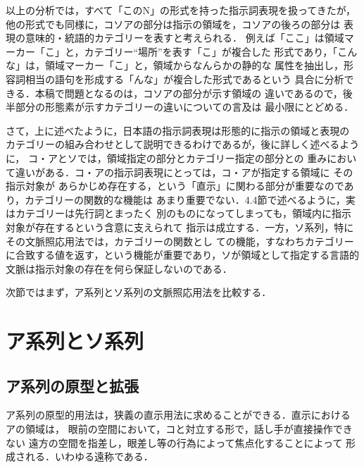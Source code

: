 以上の分析では，すべて「このN」の形式を持った指示詞表現を扱ってきたが，
他の形式でも同様に，コソアの部分は指示の領域を，コソアの後ろの部分は
表現の意味的・統語的カテゴリーを表すと考えられる．
例えば「ここ」は領域マーカー「こ」と，カテゴリー``場所''を表す「こ」が複合した
形式であり，「こんな」は，領域マーカー「こ」と，領域からなんらかの静的な
属性を抽出し，形容詞相当の語句を形成する「んな」が複合した形式であるという
具合に分析できる．本稿で問題となるのは，コソアの部分が示す領域の
違いであるので，後半部分の形態素が示すカテゴリーの違いについての言及は
最小限にとどめる．

さて，上に述べたように，日本語の指示詞表現は形態的に指示の領域と表現の
カテゴリーの組み合わせとして説明できるわけであるが，後に詳しく述べるように，
コ・アとソでは，領域指定の部分とカテゴリー指定の部分との
重みにおいて違いがある．コ・アの指示詞表現にとっては，コ・アが指定する領域に
その指示対象が
あらかじめ存在する，という「直示」に関わる部分が重要なのであり，カテゴリーの関数的な機能は
あまり重要でない．4.4節で述べるように，実はカテゴリーは先行詞とまったく
別のものになってしまっても，領域内に指示対象が存在するという含意に支えられて
指示は成立する．一方，ソ系列，特にその文脈照応用法では，カテゴリーの関数とし
ての機能，すなわちカテゴリーに合致する値を返す，という機能が重要であり，ソが領域として指定する言語的文脈は指示対象の存在を何ら保証しないのである．

次節ではまず，ア系列とソ系列の文脈照応用法を比較する．

\vspace{-3mm}
\section{ア系列とソ系列}
\subsection{ア系列の原型と拡張}
ア系列の原型的用法は，狭義の直示用法に求めることができる．直示における
アの領域は，
眼前の空間において，コと対立する形で，話し手が直接操作できない
遠方の空間を指差し，眼差し等の行為によって焦点化することによって
形成される．いわゆる遠称である．

